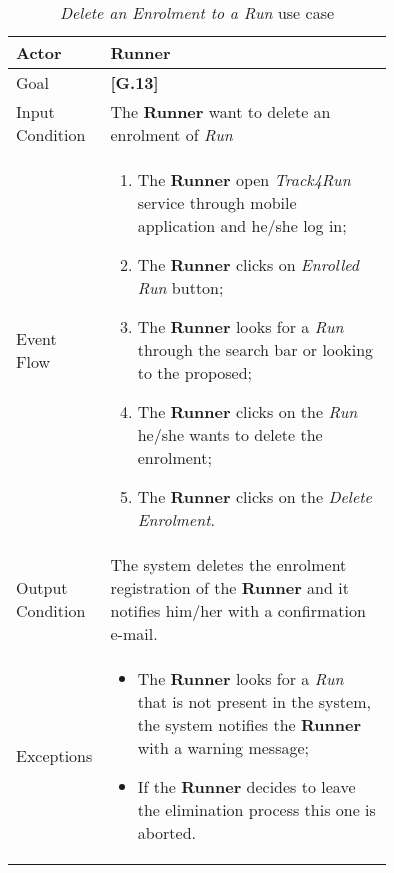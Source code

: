 \begin{center}
\begin{table}
\begin{tabular}{ | l | p{0.75\linewidth} | }
  \hline
    Actor & \textbf{Runner} \\ \hline
    Goal & \textbf{[G.13]} \\ \hline
    Input Condition & The \textbf{Runner} want to delete an enrolment of \textit{Run} \\ \hline
    Event Flow & \begin{minipage}[t]{0.7\textwidth}
      \begin{enumerate}
        \item The \textbf{Runner} open \textit{Track4Run} service through mobile application and he/she log in;
        \item The \textbf{Runner} clicks on \textit{Enrolled Run} button;
        \item The \textbf{Runner} looks for a \textit{Run} through the search bar or looking to the proposed;
        \item The \textbf{Runner} clicks on the \textit{Run} he/she wants to delete the enrolment;
        \item The \textbf{Runner} clicks on the \textit{Delete Enrolment}.
      \end{enumerate}
    \smallskip
  \end{minipage} \\ \hline
  Output Condition & The system deletes the enrolment registration of the \textbf{Runner} and it notifies him/her with a confirmation e-mail. \\ \hline
  Exceptions & \begin{minipage}[t]{0.7\textwidth}
    \begin{itemize}
      \smallskip
      \item The \textbf{Runner} looks for a \textit{Run} that is not present in the system, the system notifies the \textbf{Runner} with a warning message;
      \item If the \textbf{Runner} decides to leave the elimination process this one is aborted.
    \end{itemize}
    \smallskip
  \end{minipage}  \\ \hline
\end{tabular}
\caption{\textit{Delete an Enrolment to a Run} use case}
\label{table:deleteEnrolmentTable}
\end{table}
\end{center}
